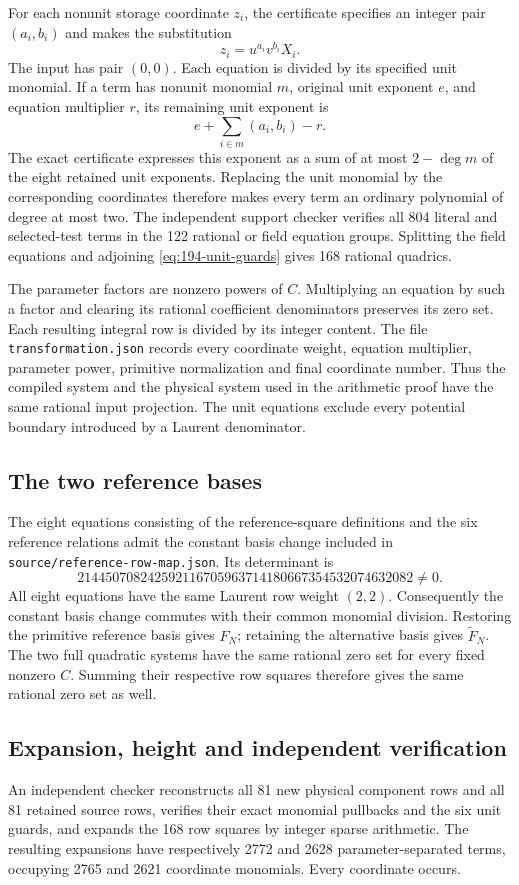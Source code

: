 \documentclass[11pt,a4paper]{article}
\begin{document}
For each nonunit storage coordinate $z_i$, the certificate specifies an
integer pair $(a_i,b_i)$ and makes the substitution
\[
                         z_i=u^{a_i}v^{b_i}X_i.
\]
The input has pair $(0,0)$. Each equation is divided by its specified
unit monomial. If a term has nonunit monomial $m$, original unit
exponent $e$, and equation multiplier $r$, its remaining unit exponent is
\[
                    e+\sum_{i\in m}(a_i,b_i)-r.
\]
The exact certificate expresses this exponent as a sum of at most
$2-\deg m$ of the eight retained unit exponents. Replacing the unit
monomial by the corresponding coordinates therefore makes every term
an ordinary polynomial of degree at most two. The independent support
checker verifies all 804 literal and selected-test terms in the 122
rational or field equation groups. Splitting the field equations and
adjoining \eqref{eq:194-unit-guards} gives 168 rational quadrics.

The parameter factors are nonzero powers of $C$. Multiplying an equation
by such a factor and clearing its rational coefficient denominators
preserves its zero set. Each resulting integral row is divided by its
integer content. The file \nolinkurl{transformation.json} records every
coordinate weight, equation multiplier, parameter power, primitive
normalization and final coordinate number. Thus the compiled system and
the physical system used in the arithmetic proof have the same rational
input projection. The unit equations exclude every potential boundary
introduced by a Laurent denominator.

\subsection{The two reference bases}
The eight equations consisting of the reference-square definitions and
the six reference relations admit the constant basis change included in
\nolinkurl{source/reference-row-map.json}. Its determinant is
\[
             214450708242592116705963714180667354532074632082\ne0.
\]
All eight equations have the same Laurent row weight $(2,2)$.
Consequently the constant basis change commutes with their common
monomial division. Restoring the primitive reference basis gives
$F_N$; retaining the alternative basis gives $\widetilde F_N$.
The two full quadratic systems have the same rational zero set for every
fixed nonzero $C$. Summing their respective row squares therefore gives
the same rational zero set as well.

\subsection{Expansion, height and independent verification}
An independent checker reconstructs all 81 new physical component rows
and all 81 retained source rows, verifies their exact monomial
pullbacks and the six unit guards, and expands the 168 row squares by
integer sparse arithmetic. The resulting expansions have respectively
2772 and 2628 parameter-separated terms, occupying 2765 and 2621
coordinate monomials. Every coordinate occurs.
\end{document}
